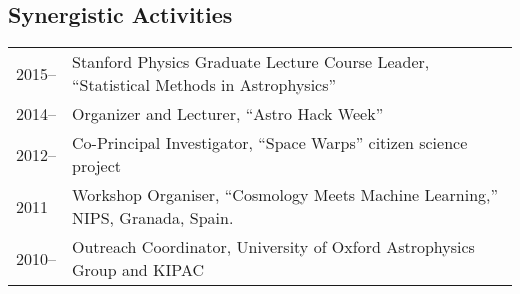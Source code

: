 %


\subsection*{Synergistic Activities}

\noindent
\begin{tabular}{@{}p{2.5cm}p{15.5cm}}
2015--      & Stanford Physics Graduate Lecture Course Leader, ``Statistical Methods in Astrophysics'' \\
2014--      & Organizer and Lecturer, ``Astro Hack Week'' \\
2012--      & Co-Principal Investigator, ``Space Warps'' citizen science project \\
2011        & Workshop Organiser, ``Cosmology Meets Machine Learning,'' NIPS, Granada, Spain. \\
2010--      & Outreach Coordinator, University of Oxford Astrophysics Group and KIPAC
\end{tabular}
